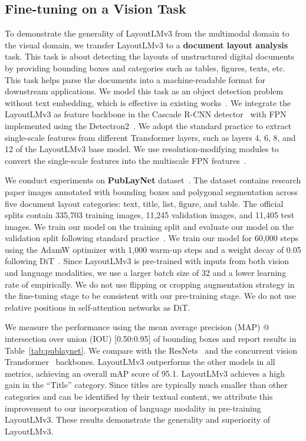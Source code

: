 \documentclass[sigconf]{acmart}
\begin{document}
\subsection{Fine-tuning on a Vision Task}
To demonstrate the generality of LayoutLMv3 from the multimodal domain to the visual domain, we transfer LayoutLMv3 to a \textbf{document layout analysis} task.
This task is about detecting the layouts of unstructured digital documents by providing bounding boxes and categories such as tables, figures, texts, etc.
This task helps parse the documents into a machine-readable format for downstream applications.
We model this task as an object detection problem without text embedding, which is effective in existing works~\cite{zhong2019publaynet, gu2021unidoc, li2022dit}.
We integrate the LayoutLMv3 as feature backbone in the Cascade R-CNN detector~\cite{cai2018cascade} with FPN~\cite{lin2017feature} implemented using the Detectron2~\cite{wu2019detectron2}.
We adopt the standard practice to extract single-scale features from different Transformer layers, such as layers 4, 6, 8, and 12 of the LayoutLMv3 base model. We use resolution-modifying modules to convert the single-scale features into the multiscale FPN features~\cite{ali2021xcit,li2021benchmarking,li2022dit}.

We conduct experiments on \textbf{PubLayNet} dataset~\cite{zhong2019publaynet}.
The dataset contains research paper images annotated with bounding boxes and polygonal segmentation across five document layout categories: text, title, list, figure, and table.
The official splits contain 335,703 training images, 11,245 validation images, and 11,405 test images. We train our model on the training split and evaluate our model on the validation split following standard practice~\cite{zhong2019publaynet,gu2021unidoc,li2022dit}.
We train our model for 60,000 steps using the AdamW optimizer with 1,000 warm-up steps and a weight decay of 0.05 following DiT~\cite{li2022dit}. Since LayoutLMv3 is pre-trained with inputs from both vision and language modalities, we use a larger batch size of 32 and a lower learning rate of  empirically.
We do not use flipping or cropping augmentation strategy in the fine-tuning stage to be consistent with our pre-training stage.
We do not use relative positions in self-attention networks as DiT.

We measure the performance using the mean average precision (MAP) @ intersection over union (IOU) [0.50:0.95] of bounding boxes and report results in Table~\ref{tab:publaynet}.
We compare with the ResNets~\cite{zhong2019publaynet, gu2021unidoc} and the concurrent vision Transformer~\cite{li2022dit} backbones.
LayoutLMv3 outperforms the other models in all metrics, achieving an overall mAP score of 95.1.
LayoutLMv3 achieves a high gain in the ``Title'' category. Since titles are typically much smaller than other categories and can be identified by their textual content, we attribute this improvement to our incorporation of language modality in pre-training LayoutLMv3.
These results demonstrate the generality and superiority of LayoutLMv3.
\end{document}
